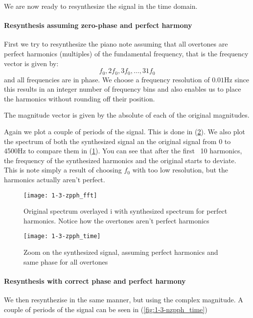 We are now ready to resynthesize the signal in the time domain.
\paragraph{ Resynthesis assuming zero-phase and perfect harmony }
First we try to resynthesize the piano note assuming that all overtones are
perfect harmonics (multiples) of the fundamental frequency, that is the
frequency vector is given by:
\begin{equation*}
 f_0, 2 f_0, 3 f_0, \ldots , 31 f_0
\end{equation*}
and all frequencies are in phase.
We choose a frequency resolution of $0.01\mbox{Hz}$ since this results in an
integer number of frequency bins and also enables us to place the harmonics
without rounding off their position.

The magnitude vector is given by the absolute of each of the original
magnitudes.

Again we plot a couple of periods of the signal. This is done in
(\ref{fig:1-3-zpph_time}). We also plot the spectrum of both the synthesized
signal an the original signal from 0 to 4500Hz to compare them in
(\ref{fig:1-3-zpph_fft}). You can see that after the first ~10 harmonics, the
frequency of the synthesized harmonics and the original starts to deviate. This
is note simply a result of choosing $f_0$ with too low resolution, but the
harmonics actually aren't perfect.

\begin{figure}
	\center
	\texttt{[image: 1-3-zpph\_fft]}
	\caption{ Original spectrum overlayed i with synthesized
spectrum for perfect harmonics. Notice how the overtones aren't perfect
harmonics }
	\label{fig:1-3-zpph_fft}
\end{figure}

\begin{figure}
	\center
	\texttt{[image: 1-3-zpph\_time]}
	\caption{ Zoom on the synthesized signal, assuming perfect
harmonics and same phase for all overtones }
	\label{fig:1-3-zpph_time}
\end{figure}


\paragraph{ Resynthesis with correct phase and perfect harmony }
We then resynthezise in the same manner, but using the complex magnitude.
A couple of periods of the signal can be seen in
(\ref{fig:1-3-nzpph_time})

